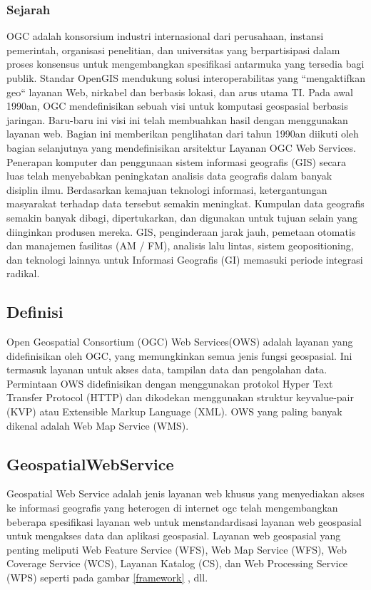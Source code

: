 \subsubsection{Sejarah}
OGC adalah konsorsium industri internasional dari perusahaan, instansi pemerintah, organisasi penelitian, 
dan universitas yang berpartisipasi dalam proses konsensus untuk mengembangkan spesifikasi antarmuka yang tersedia bagi publik. 
Standar OpenGIS mendukung solusi interoperabilitas yang ``mengaktifkan geo`` layanan Web, nirkabel dan berbasis lokasi, dan arus utama TI. 
Pada awal 1990an, OGC mendefinisikan sebuah visi untuk komputasi geospasial berbasis jaringan. 
Baru-baru ini visi ini telah membuahkan hasil dengan menggunakan layanan web. 
Bagian ini memberikan penglihatan dari tahun 1990an diikuti oleh bagian selanjutnya yang mendefinisikan arsitektur Layanan OGC Web Services. Penerapan komputer dan penggunaan sistem informasi geografis (GIS) secara luas telah menyebabkan peningkatan analisis data geografis dalam banyak disiplin ilmu. Berdasarkan kemajuan teknologi informasi, ketergantungan masyarakat terhadap data tersebut semakin meningkat. Kumpulan data geografis semakin banyak dibagi, dipertukarkan, dan digunakan untuk tujuan
selain yang diinginkan produsen mereka. GIS, penginderaan jarak jauh, pemetaan otomatis dan manajemen fasilitas (AM / FM), 
analisis lalu lintas, sistem geopositioning, dan teknologi lainnya untuk Informasi Geografis (GI) memasuki periode integrasi radikal. \cite{lupp2008open}

\subsection{Definisi}
Open Geospatial Consortium (OGC) Web Services(OWS) adalah layanan yang didefinisikan oleh OGC, 
yang memungkinkan semua jenis fungsi geospasial. 
Ini termasuk layanan untuk akses data, tampilan data dan pengolahan data. 
Permintaan OWS didefinisikan dengan menggunakan protokol Hyper Text Transfer Protocol (HTTP) 
dan dikodekan menggunakan struktur keyvalue-pair (KVP) atau Extensible Markup Language (XML). 
OWS yang paling banyak dikenal adalah Web Map Service (WMS). \cite{lupp2008open} 

\subsection{GeospatialWebService}
Geospatial Web Service adalah jenis layanan web khusus yang menyediakan akses ke informasi geografis yang heterogen di internet ogc telah mengembangkan beberapa
spesifikasi layanan web untuk menstandardisasi layanan web geospasial untuk mengakses data dan aplikasi geospasial. 
Layanan web geospasial yang penting meliputi Web Feature Service (WFS), Web Map Service (WFS), Web Coverage Service (WCS), 
Layanan Katalog (CS), dan Web Processing Service (WPS) seperti pada gambar \ref{framework} , dll. \cite{lupp2008open} 

